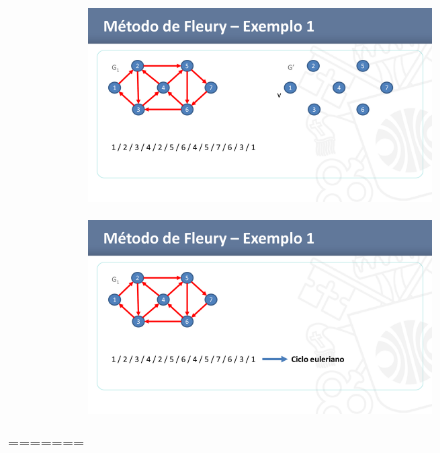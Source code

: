 \begin{figure}[htbp]  
    \begin{subfigure}{.4\textwidth}
		\includegraphics[width=\textwidth]{imagem/graficos/1a1455b7b9174768d1c6a0d41673e79dHTztESkzBtQzsXWu-49.png}
	\end{subfigure}
    \begin{subfigure}{.4\textwidth}
		\includegraphics[width=\textwidth]{imagem/graficos/1a1455b7b9174768d1c6a0d41673e79dHTztESkzBtQzsXWu-50.png}
	\end{subfigure}
\end{figure}

=======
